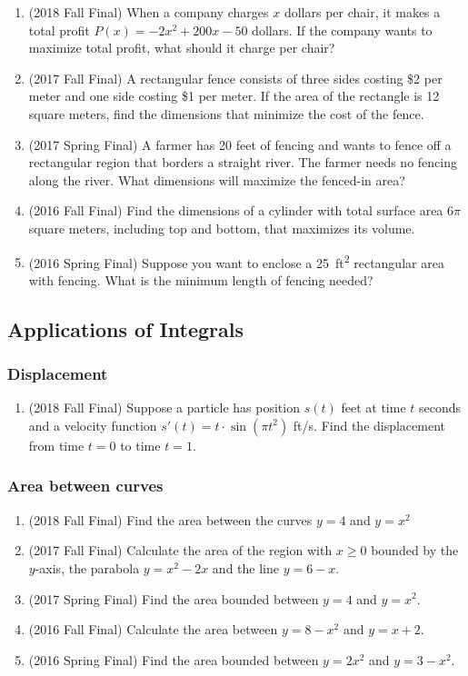 \documentclass[10pt]{scrartcl}
\begin{document}
\begin{enumerate}
\item (2018 Fall Final) When a company charges $x$ dollars per chair, it makes a total profit $P(x) = -2x^2 + 200x - 50$ dollars. If the company wants to maximize total profit, what should it charge per chair?
\item (2017 Fall Final) A rectangular fence consists of three sides costing \$2 per meter and one side costing \$1 per meter. If the area of the rectangle is 12 square meters, find the dimensions that minimize the cost of the fence.
\item (2017 Spring Final) A farmer has 20 feet of fencing and wants to fence off a rectangular region that borders a straight river. The farmer needs no fencing along the river. What dimensions will maximize the fenced-in area?
\item (2016 Fall Final) Find the dimensions of a cylinder with total surface area $6\pi$ square meters, including top and bottom, that maximizes its volume. 
\item (2016 Spring Final) Suppose you want to enclose a \SI{25}{ft^2} rectangular area with fencing. What is the minimum length of fencing needed?
\end{enumerate}


\subsection{Applications of Integrals}
\subsubsection{Displacement}
\begin{enumerate}
\item (2018 Fall Final) Suppose a particle has position $s(t)$ feet at time $t$ seconds and a velocity function $s'(t) = t \cdot \sin(\pi t^2)$ ft/s. Find the displacement from time $t=0$ to time $t = 1$. 
\end{enumerate}

\subsubsection{Area between curves}
\begin{enumerate}
\item (2018 Fall Final) Find the area between the curves $y = 4$ and $y = x^2$
\item (2017 Fall Final) Calculate the area of the region with $x\ge 0$ bounded by the $y$-axis, the parabola $y = x^2 - 2x$ and the line $y = 6-x$.
\item (2017 Spring Final) Find the area bounded between $y = 4$ and $y = x^2$. 
\item (2016 Fall Final) Calculate the area between $y = 8-x^2$ and $y = x+2$. 
\item (2016 Spring Final) Find the area bounded between $y = 2x^2$ and $y = 3 - x^2$. 
\end{enumerate}
\end{document}
